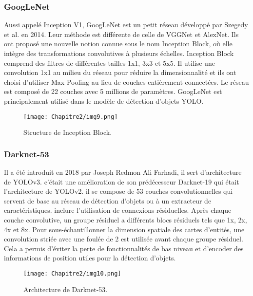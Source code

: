           \subsubsection{GoogLeNet} \cite{googlenet_paper}
          Aussi appelé Inception V1, GoogLeNet est un petit réseau développé par Szegedy et al. en 2014. Leur méthode est différente de celle de VGGNet et AlexNet. Ils ont proposé une nouvelle notion connue sous le nom Inception Block, où elle intègre des transformations convolutives à plusieurs échelles. Inception Block comprend des filtres de différentes tailles 1x1, 3x3 et 5x5. Il utilise une convolution 1x1 au milieu du réseau pour réduire la dimensionnalité et ils ont choisi d'utiliser Max-Pooling au lieu de couches entièrement connectées. Le réseau est composé de 22 couches avec 5 millions de paramètres. GoogLeNet est principalement utilisé dans le modèle de détection d'objets YOLO.
          \begin{figure}[H]
               \centering
               \texttt{[image: Chapitre2/img9.png]}
               \caption{Structure de Inception Block.}
               \label{img9}
               \end{figure}

           \subsubsection{Darknet-53} \cite{yolov3_paper}
           Il a été introduit en 2018 par Joseph Redmon Ali Farhadi, il sert d'architecture de YOLOv3. c'était une amélioration de son prédécesseur Darknet-19 qui était l'architecture de YOLOv2. il se compose de 53 couches convolutionnelles qui servent de base au réseau de détection d'objets ou à un extracteur de caractéristiques. inclure l'utilisation de connexions résiduelles. Après chaque couche convolutive, un groupe résiduel a différents blocs résiduels tels que 1x, 2x, 4x et 8x. Pour sous-échantillonner la dimension spatiale des cartes d'entités, une convolution striée avec une foulée de 2 est utilisée avant chaque groupe résiduel. Cela a permis d'éviter la perte de fonctionnalités de bas niveau et d'encoder des informations de position utiles pour la détection d'objets.
           \begin{figure}[H]
                \centering
                \texttt{[image: Chapitre2/img10.png]}
                \caption{Architecture de Darknet-53.}
                \label{img10}
                \end{figure}




